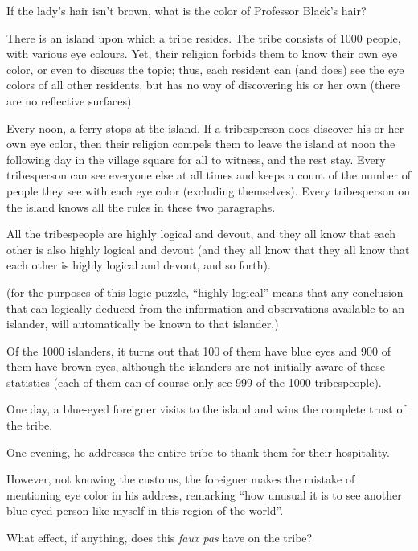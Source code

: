 \documentclass[11pt]{exam}
\begin{document}
\begin{questions}
If the lady's hair isn't brown, what is the color of Professor Black's 
hair? 

\newpage 

\question There is an island upon which a tribe resides. The tribe consists of 1000 people, with various eye colours. Yet, their religion forbids them to know their own eye color, or even to discuss the topic; thus, each resident can (and does) see the eye colors of all other residents, but has no way of discovering his or her own (there are no reflective surfaces). 

Every noon, a ferry stops at the island. If a tribesperson does discover his or her own eye color, then their religion compels them to leave the island at noon the following day in the village square for all to witness, and the rest stay. Every tribesperson can see everyone else at all times and keeps a count of the number of people they see with each eye color (excluding themselves). Every tribesperson on the island knows all the rules in these two paragraphs.

All the tribespeople are highly logical and devout, and they all know that each other is also highly logical and devout (and they all know that they all know that each other is highly logical and devout, and so forth).

(for the purposes of this logic puzzle, ``highly logical'' means that any conclusion that can logically deduced from the information and observations available to an islander, will automatically be known to that islander.)

Of the 1000 islanders, it turns out that 100 of them have blue eyes and 900 of them have brown eyes, although the islanders are not initially aware of these statistics (each of them can of course only see 999 of the 1000 tribespeople).

One day, a blue-eyed foreigner visits to the island and wins the complete trust of the tribe.

One evening, he addresses the entire tribe to thank them for their hospitality.

However, not knowing the customs, the foreigner makes the mistake of mentioning eye color in his address, remarking ``how unusual it is to see another blue-eyed person like myself in this region of the world''.

What effect, if anything, does this \emph{faux pas} have on the tribe?

\end{questions}
\end{document}
